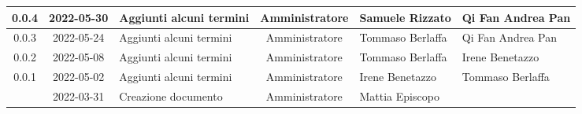 \begin{center}
\begin{longtable}{ |c|c|p{8em}|c|m{5em}|m{6em}| }
	\hline
	0.0.4 & 2022-05-30 & Aggiunti alcuni termini & Amministratore & Samuele \newline Rizzato & Qi Fan \newline Andrea Pan\\
	\hline
	0.0.3 & 2022-05-24 & Aggiunti alcuni termini & Amministratore & Tommaso \newline Berlaffa & Qi Fan \newline Andrea Pan\\
	\hline
	0.0.2 & 2022-05-08 & Aggiunti alcuni termini & Amministratore & Tommaso \newline Berlaffa & Irene \newline Benetazzo\\
	\hline
	0.0.1 & 2022-05-02 & Aggiunti alcuni termini & Amministratore & Irene \newline Benetazzo & Tommaso \newline Berlaffa\\
	\hline
  	& 2022-03-31 & Creazione documento & Amministratore & Mattia \newline Episcopo & \\ 
	\hline
	\end{longtable}
	\end{center}
	\newpage